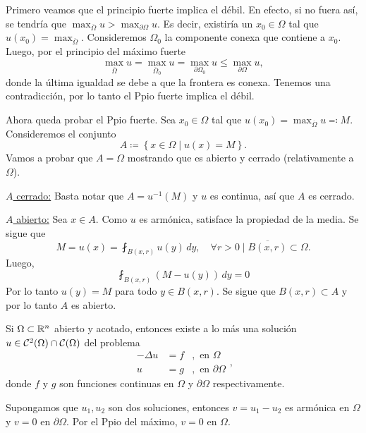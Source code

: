 \documentclass[../edp.tex]{subfiles}
\begin{document}
\begin{Demostracion}
	Primero veamos que el principio fuerte implica el débil. En efecto, si no
	fuera así, se tendría que \(\max_{\overline\Omega} u > \max_{\partial
	\Omega} u\). Es decir, existiría un \(x_0\in \Omega\) tal que \(u(x_0) =
	\max_{\overline\Omega}\). Consideremos \(\Omega_0\) la componente conexa que
	contiene a \(x_0\). Luego, por el principio del máximo fuerte 
	\begin{displaymath}
		\max_{\overline \Omega} u
		=
		\max_{\overline \Omega_0} u
		=
		\max_{\partial \Omega_0} u
		\le 
		\max_{\partial \Omega} u,
	\end{displaymath}
	donde la última igualdad se debe a que la frontera es conexa.
	Tenemos una contradicción, por lo tanto el Ppio fuerte implica el débil.

	Ahora queda probar el Ppio fuerte. Sea \(x_0\in \Omega\) tal que \(u(x_0) =
	\max_{\overline\Omega} u \eqqcolon M\). Consideremos el conjunto
	\begin{displaymath}
		A 
		\coloneqq
		\left\{
			x\in \Omega
			\mid
			u(x) = M
		\right\}.
	\end{displaymath}
	Vamos a probar que \(A = \Omega\) mostrando que es abierto y cerrado
	(relativamente a \(\Omega\)).

	\noindent \underline{\(A\) cerrado:} Basta notar que \(A = u^{-1}(M)\) y
	\(u\) es continua, así que \(A\) es cerrado.

	\noindent \underline{\(A\) abierto:} Sea \(x \in A\). Como \(u\) es
	armónica, satisface la propiedad de la media. Se sigue que
	\begin{displaymath}
		M
		=
		u(x)
		=
		\fint_{B(x,r)} u(y) \, dy,
		\quad
		\forall r > 0 \mid \overline{B(x,r)} \subset \Omega.
	\end{displaymath}
	Luego,
	\begin{displaymath}
		\fint_{B(x,r)} (M - u(y)) \, dy
		=
		0
	\end{displaymath}
	Por lo tanto \(u(y) = M\) para todo \(y \in B(x,r)\). Se sigue que \(B(x,r)
	\subset A\) y por lo tanto \(A\) es abierto.
\end{Demostracion}

\begin{Corolario}
	Si \(\Omega \subset \mathbb{R}^n\) abierto y acotado, entonces existe a lo más una
	solución \(u\in \mathcal{C}^2(\Omega) \cap \mathcal{C}(\Omega)\) del problema
	\begin{displaymath}
		\begin{array}{rrc}
			-\Delta u &= f 
			&, \text{ en } \Omega
			\\
			u &= g
			&, \text{ en } \partial\Omega
		\end{array},
	\end{displaymath}
	donde \(f\) y \(g\) son funciones continuas en \(\Omega\) y
	\(\partial\Omega\) respectivamente.
\end{Corolario}
\begin{Demostracion}
	Supongamos que \(u_1, u_2\) son dos soluciones, entonces \(v = u_1 - u_2\)
	es armónica en \(\Omega\) y \(v = 0\) en \(\partial \Omega\). Por el 
	Ppio del máximo, \(v = 0\) en \(\Omega\). 
\end{Demostracion}
\end{document}
